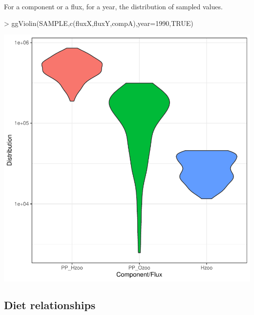 \documentclass{article}
\begin{document}
For a component or a flux, for a year, the distribution of sampled values. 
\begin{Schunk}
\begin{Sinput}
> ggViolin(SAMPLE,c(fluxX,fluxY,compA),year=1990,TRUE)
\end{Sinput}
\end{Schunk}
\includegraphics{barents_SM-018}


\clearpage

\subsection{Diet relationships}
\end{document}
